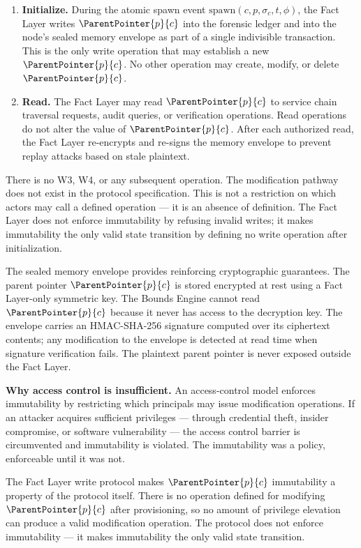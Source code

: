 \begin{enumerate}
    \item[(W1)] \textbf{Initialize.} During the atomic spawn event $\mathrm{spawn}(c, p, \sigma_c, t, \phi)$, the Fact Layer writes $\ParentPointer{p}{c}$ into the forensic ledger and into the node's sealed memory envelope as part of a single indivisible transaction. This is the only write operation that may establish a new $\ParentPointer{p}{c}$. No other operation may create, modify, or delete $\ParentPointer{p}{c}$.

    \item[(W2)] \textbf{Read.} The Fact Layer may read $\ParentPointer{p}{c}$ to service chain traversal requests, audit queries, or verification operations. Read operations do not alter the value of $\ParentPointer{p}{c}$. After each authorized read, the Fact Layer re-encrypts and re-signs the memory envelope to prevent replay attacks based on stale plaintext.
\end{enumerate}

There is no W3, W4, or any subsequent operation. The modification pathway does not exist in the protocol specification. This is not a restriction on which actors may call a defined operation --- it is an absence of definition. The Fact Layer does not enforce immutability by refusing invalid writes; it makes immutability the only valid state transition by defining no write operation after initialization.

The sealed memory envelope provides reinforcing cryptographic guarantees. The parent pointer $\ParentPointer{p}{c}$ is stored encrypted at rest using a Fact Layer-only symmetric key. The Bounds Engine cannot read $\ParentPointer{p}{c}$ because it never has access to the decryption key. The envelope carries an HMAC-SHA-256 signature computed over its ciphertext contents; any modification to the envelope is detected at read time when signature verification fails. The plaintext parent pointer is never exposed outside the Fact Layer.

\bigskip
\noindent\textbf{Why access control is insufficient.} An access-control model enforces immutability by restricting which principals may issue modification operations. If an attacker acquires sufficient privileges --- through credential theft, insider compromise, or software vulnerability --- the access control barrier is circumvented and immutability is violated. The immutability was a policy, enforceable until it was not.

The Fact Layer write protocol makes $\ParentPointer{p}{c}$ immutability a property of the protocol itself. There is no operation defined for modifying $\ParentPointer{p}{c}$ after provisioning, so no amount of privilege elevation can produce a valid modification operation. The protocol does not enforce immutability --- it makes immutability the only valid state transition.

